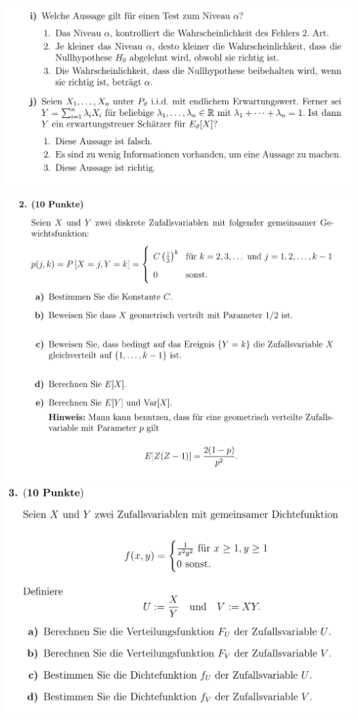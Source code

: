 \includegraphics[width=0.8\linewidth]{old_exams_prtsrc/aufgaben/tei_infk_so17_pr-5.png}\newline
\includegraphics[width=0.8\linewidth]{old_exams_prtsrc/aufgaben/tei_infk_so17_pr-6.png}\newline
\includegraphics[width=0.8\linewidth]{old_exams_prtsrc/aufgaben/tei_infk_so17_pr-7.png}\newline
